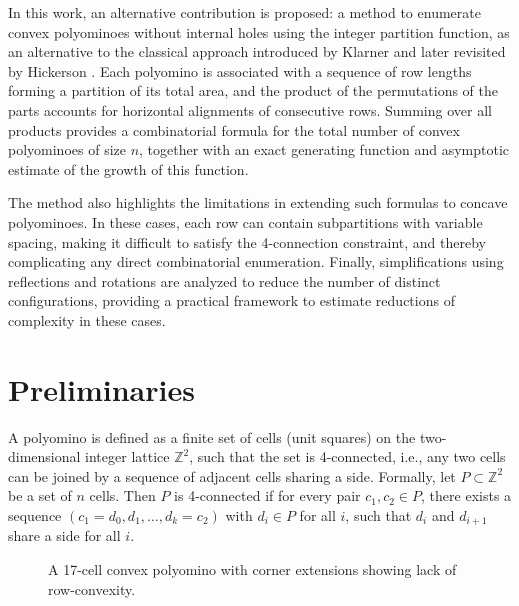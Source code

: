 \documentclass{article}
\theoremstyle{definition}
\theoremstyle{plain}
\begin{document}
In this work, an alternative contribution is proposed: a method to 
enumerate convex polyominoes without internal holes using the integer 
partition function, as an alternative to the classical approach introduced 
by Klarner \cite{klarner1965some} and later revisited by Hickerson 
\cite{hickerson1999counting}. Each polyomino is associated with a sequence 
of row lengths forming a partition of its total area, and the product of 
the permutations of the parts accounts for horizontal alignments of 
consecutive rows. Summing over all products provides a combinatorial 
formula for the total number of convex polyominoes of size $n$, together 
with an exact generating function and asymptotic estimate of the growth of 
this function.

The method also highlights the limitations in extending such formulas to 
concave polyominoes. In these cases, each row can contain subpartitions 
with variable spacing, making it difficult to satisfy the 4-connection 
constraint, and thereby complicating any direct combinatorial enumeration. 
Finally, simplifications using reflections and rotations are analyzed to 
reduce the number of distinct configurations, providing a practical 
framework to estimate reductions of complexity in these cases.

\section{Preliminaries}

A polyomino is defined as a finite set of cells (unit squares) on the 
two-dimensional integer lattice $\mathbb{Z}^2$, such that the set is 
4-connected, i.e., any two cells can be joined by a sequence of adjacent 
cells sharing a side. Formally, let $P \subset \mathbb{Z}^2$ be a set of 
$n$ cells. Then $P$ is 4-connected if for every pair $c_1, c_2 \in P$, 
there exists a sequence $(c_1 = d_0, d_1, \dots, d_k = c_2)$ with 
$d_i \in P$ for all $i$, such that $d_i$ and $d_{i+1}$ share a side for 
all $i$.

\begin{figure}[H]
\centering
{}
\caption{A 17-cell convex polyomino with corner extensions showing lack 
of row-convexity.}
\label{fig:convex_not_row_convex}
\end{figure}
\end{document}
